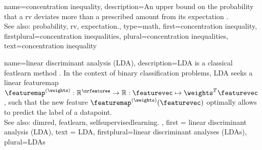 {name={concentration inequality}, 
	description={An upper bound on the \gls{probability} that 
	    a \gls{rv} deviates more than a prescribed amount from its \gls{expectation} \cite{Wain2019}. 
		\\
		See also: \gls{probability}, \gls{rv}, \gls{expectation}.}, 
	type=math, 
	first={concentration inequality},
	firstplural={concentration inequalities},
	plural={concentration inequalities},  
	text={concentration inequality}
}

{name={linear discriminant analysis (LDA)}, 
 description={LDA  is a classical 
             \gls{featlearn} method \cite{BishopBook,Fisher1936Taxonomic}. 
			 In the context of binary \gls{classification} problems, 
			 LDA seeks a linear \gls{featuremap} $\featuremap^{(\weights)}: \mathbb{R}^{\nrfeatures} 
			 \rightarrow \mathbb{R}: \featurevec \mapsto \weights^{T} \featurevec$, 
			 such that the new \gls{feature} $\featuremap^{(\weights)}(\featurevec)$ 
			 optimally allows to predict the \gls{label} of a \gls{datapoint}. \\
			See also: \gls{dimred}, \gls{featlearn}, \gls{selfsupervisedlearning}. 
 }, 
 first = {linear discriminant analysis (LDA)},
 text = {LDA}, 
 firstplural={linear discriminant analyses (LDAs)},
 plural={LDAs}
}

